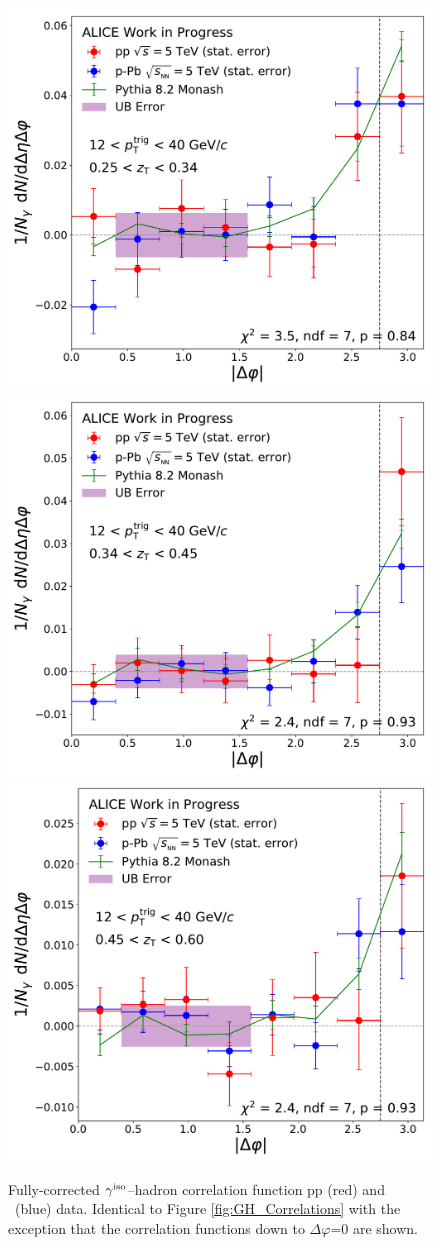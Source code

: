 \begin{figure}
\includegraphics[width = 0.24 \textwidth]{G-H_New/dPhi_to_0/Cs_Final_Indv_pT_0_zT_5.pdf}
\includegraphics[width = 0.24 \textwidth]{G-H_New/dPhi_to_0/Cs_Final_Indv_pT_0_zT_6.pdf}
\includegraphics[width = 0.24 \textwidth]{G-H_New/dPhi_to_0/Cs_Final_Indv_pT_0_zT_7.pdf}
\caption{Fully-corrected $\gamma^\mathrm{iso}$--hadron correlation function pp (red) and \pPb~(blue) data. Identical to Figure \ref{fig:GH_Correlations} with the exception that the correlation functions down to $\Delta\varphi$=0 are shown.}
\label{fig:CorrelationFinal_downtozero}
\end{figure}


